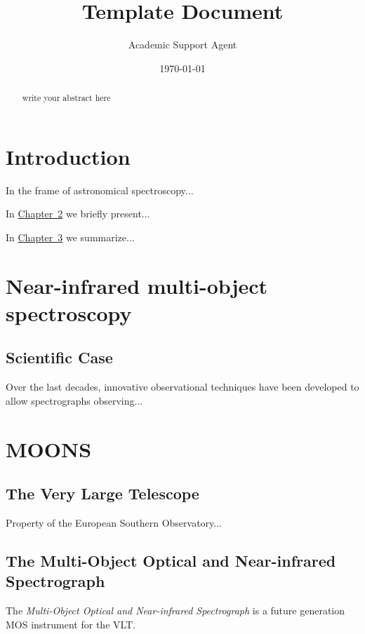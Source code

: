 \documentclass{article}
\title{Template Document}
\author{Academic Support Agent}
\date{\today}
\begin{document}
\maketitle

\maketitle

\begin{abstract}
write your abstract here
\end{abstract}




\chapter{Introduction}
\lettrine[lines=2, findent=3pt, nindent=0pt]{I}{}n the frame of astronomical spectroscopy...

\bigskip
In \hyperref[chap:1]{Chapter~\ref*{chap:1}} we  briefly present...

\bigskip
In \hyperref[chap:2]{Chapter~\ref*{chap:2}} we summarize...

\chapter{Near-infrared multi-object spectroscopy}
\label{chap:1} 
\section{Scientific Case}
\label{sec:caso}
Over the last decades, innovative observational techniques have been developed to allow spectrographs observing...

\chapter{MOONS}
\label{chap:2}
\section{The Very Large Telescope}
Property of the European Southern Observatory...

\section{The Multi-Object Optical and Near-infrared Spectrograph}
\label{sec:moons}

The \textit{Multi-Object Optical and Near-infrared Spectrograph} is a future generation MOS instrument for the VLT. 
\end{document}
